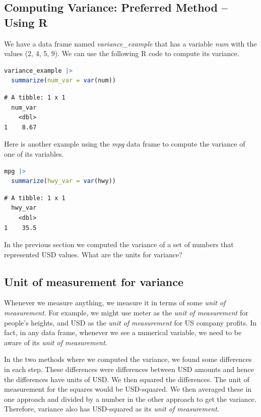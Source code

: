 \documentclass[
  12pt,
  letterpaper,
  DIV=11,
  numbers=noendperiod]{scrreprt}
\begin{document}
\subsection{Computing Variance: Preferred Method -- Using
R}\label{computing-variance-preferred-method-using-r}

We have a data frame named \emph{variance\_example} that has a variable
\emph{num} with the values (2, 4, 5, 9). We can use the following R code
to compute its variance.

\begin{lstlisting}[language=R]
variance_example |> 
  summarize(num_var = var(num))
\end{lstlisting}

\begin{lstlisting}
# A tibble: 1 x 1
  num_var
    <dbl>
1    8.67
\end{lstlisting}

Here is another example using the \emph{mpg} data frame to compute the
variance of one of its variables.

\begin{lstlisting}[language=R]
mpg |>
  summarize(hwy_var = var(hwy))
\end{lstlisting}

\begin{lstlisting}
# A tibble: 1 x 1
  hwy_var
    <dbl>
1    35.5
\end{lstlisting}

In the previous section we computed the variance of a set of numbers
that represented USD values. What are the units for variance?

\subsection{Unit of measurement for
variance}\label{unit-of-measurement-for-variance}

Whenever we measure anything, we measure it in terms of some \emph{unit
of measurement}. For example, we might use meter as the \emph{unit of
measurement} for people's heights, and USD as the \emph{unit of
measurement} for US company profits. In fact, in any data frame,
whenever we see a numerical variable, we need to be aware of its
\emph{unit of measurement}.

In the two methods where we computed the variance, we found some
differences in each step. These differences were differences between USD
amounts and hence the differences have units of USD. We then squared the
differences. The unit of measurement for the squares would be
USD-squared. We then averaged these in one approach and divided by a
number in the other approach to get the variance. Therefore, variance
also has USD-squared as its \emph{unit of measurement}.
\end{document}
